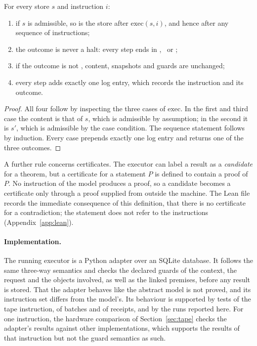 \begin{proposition}\label{prop:machine}
For every store $s$ and instruction $i$:
\begin{enumerate}[label=(\roman*),nosep,leftmargin=2em]
\item if $s$ is admissible, so is the store after $\mathrm{exec}(s,i)$, and hence after any sequence of instructions;
\item the outcome is never a halt: every step ends in \cont, \guard\ or \reject;
\item if the outcome is not \cont, content, snapshots and guards are unchanged;
\item every step adds exactly one log entry, which records the instruction and its outcome.
\end{enumerate}
\end{proposition}

\begin{proof}
All four follow by inspecting the three cases of $\mathrm{exec}$. In the first and third case the content is that of $s$, which is
admissible by assumption; in the second it is $s'$, which is admissible by the case condition. The sequence statement follows by
induction. Every case prepends exactly one log entry and returns one of the three outcomes.
\end{proof}

A further rule concerns certificates. The executor can label a result as a \emph{candidate} for a theorem, but a certificate for a
statement $P$ is defined to contain a proof of $P$. No instruction of the model produces a proof, so a candidate becomes a certificate only through a proof supplied from outside the
machine. The Lean file records the immediate consequence of this definition, that there is no certificate for a contradiction; the
statement does not refer to the instructions (Appendix~\ref{app:lean}).

\paragraph{Implementation.} The running executor is a Python adapter over an SQLite database. It follows the same three-way
semantics and checks the declared guards of the context, the request and the objects involved, as well as the linked premises, before
any result is stored. That the adapter behaves like the abstract model is not proved, and its instruction set differs from the
model's. Its behaviour is supported by tests of the tape instruction, of batches and of receipts, and by the runs reported here. For one
instruction, the hardware comparison of Section~\ref{sec:tape} checks the adapter's results against other implementations,
which supports the results of that instruction but not the guard semantics as such.

